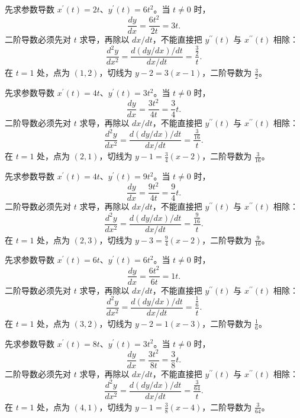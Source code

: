 \documentclass[12pt,fontset=fandol]{ctexart}
\begin{document}
\begin{solve}\label{ans:c9q7}
先求参数导数 $x^{\prime}(t)=2t$、$y^{\prime}(t)=6t^2$。当 $t\ne0$ 时，
\[
\frac{dy}{dx}=\frac{6t^2}{2t}=3t.
\]
二阶导数必须先对 $t$ 求导，再除以 $dx/dt$，不能直接把 $y^{\prime\prime}(t)$ 与 $x^{\prime\prime}(t)$ 相除：
\[
\frac{d^2y}{dx^2}=\frac{d(dy/dx)/dt}{dx/dt}=\frac{\frac{3}{2}}t.
\]
在 $t=1$ 处，点为 $(1,2)$，切线为 $y-2=3(x-1)$，二阶导数为 $\frac{3}{2}$。
\end{solve}

\begin{solve}\label{ans:c9q8}
先求参数导数 $x^{\prime}(t)=4t$、$y^{\prime}(t)=3t^2$。当 $t\ne0$ 时，
\[
\frac{dy}{dx}=\frac{3t^2}{4t}=\frac{3}{4}t.
\]
二阶导数必须先对 $t$ 求导，再除以 $dx/dt$，不能直接把 $y^{\prime\prime}(t)$ 与 $x^{\prime\prime}(t)$ 相除：
\[
\frac{d^2y}{dx^2}=\frac{d(dy/dx)/dt}{dx/dt}=\frac{\frac{3}{16}}t.
\]
在 $t=1$ 处，点为 $(2,1)$，切线为 $y-1=\frac{3}{4}(x-2)$，二阶导数为 $\frac{3}{16}$。
\end{solve}

\begin{solve}\label{ans:c9q9}
先求参数导数 $x^{\prime}(t)=4t$、$y^{\prime}(t)=9t^2$。当 $t\ne0$ 时，
\[
\frac{dy}{dx}=\frac{9t^2}{4t}=\frac{9}{4}t.
\]
二阶导数必须先对 $t$ 求导，再除以 $dx/dt$，不能直接把 $y^{\prime\prime}(t)$ 与 $x^{\prime\prime}(t)$ 相除：
\[
\frac{d^2y}{dx^2}=\frac{d(dy/dx)/dt}{dx/dt}=\frac{\frac{9}{16}}t.
\]
在 $t=1$ 处，点为 $(2,3)$，切线为 $y-3=\frac{9}{4}(x-2)$，二阶导数为 $\frac{9}{16}$。
\end{solve}

\begin{solve}\label{ans:c9q10}
先求参数导数 $x^{\prime}(t)=6t$、$y^{\prime}(t)=6t^2$。当 $t\ne0$ 时，
\[
\frac{dy}{dx}=\frac{6t^2}{6t}=1t.
\]
二阶导数必须先对 $t$ 求导，再除以 $dx/dt$，不能直接把 $y^{\prime\prime}(t)$ 与 $x^{\prime\prime}(t)$ 相除：
\[
\frac{d^2y}{dx^2}=\frac{d(dy/dx)/dt}{dx/dt}=\frac{\frac{1}{6}}t.
\]
在 $t=1$ 处，点为 $(3,2)$，切线为 $y-2=1(x-3)$，二阶导数为 $\frac{1}{6}$。
\end{solve}

\begin{solve}\label{ans:c9q11}
先求参数导数 $x^{\prime}(t)=8t$、$y^{\prime}(t)=3t^2$。当 $t\ne0$ 时，
\[
\frac{dy}{dx}=\frac{3t^2}{8t}=\frac{3}{8}t.
\]
二阶导数必须先对 $t$ 求导，再除以 $dx/dt$，不能直接把 $y^{\prime\prime}(t)$ 与 $x^{\prime\prime}(t)$ 相除：
\[
\frac{d^2y}{dx^2}=\frac{d(dy/dx)/dt}{dx/dt}=\frac{\frac{3}{64}}t.
\]
在 $t=1$ 处，点为 $(4,1)$，切线为 $y-1=\frac{3}{8}(x-4)$，二阶导数为 $\frac{3}{64}$。
\end{solve}
\end{document}
